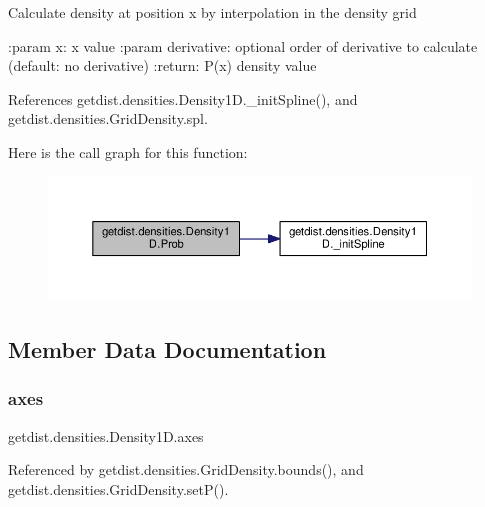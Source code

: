\begin{DoxyVerb}Calculate density at position x by interpolation in the density grid

:param x: x value
:param derivative: optional order of derivative to calculate (default: no derivative)
:return: P(x) density value
\end{DoxyVerb}
 

References getdist.\+densities.\+Density1\+D.\+\_\+init\+Spline(), and getdist.\+densities.\+Grid\+Density.\+spl.

Here is the call graph for this function\+:
\nopagebreak
\begin{figure}[H]
\begin{center}
\leavevmode
\includegraphics[width=350pt]{classgetdist_1_1densities_1_1Density1D_a4b2fde67983463137942346830c4d00e_cgraph}
\end{center}
\end{figure}


\subsection{Member Data Documentation}
\mbox{\label{classgetdist_1_1densities_1_1Density1D_acc8b83f5eafa6e281895b8122ed6e827}} 
\subsubsection{\texorpdfstring{axes}{axes}}
{\footnotesize\ttfamily getdist.\+densities.\+Density1\+D.\+axes}



Referenced by getdist.\+densities.\+Grid\+Density.\+bounds(), and getdist.\+densities.\+Grid\+Density.\+set\+P().

\mbox{\label{classgetdist_1_1densities_1_1Density1D_a93230b021ba34c1ea0d17d953fee3799}} 
